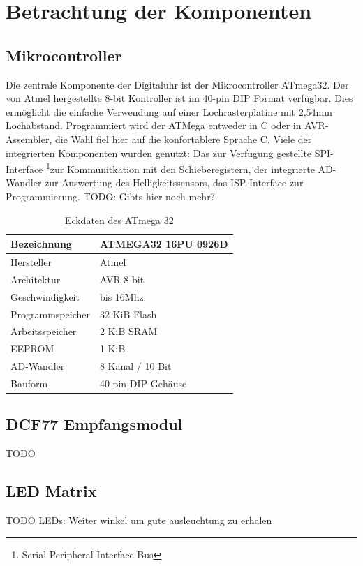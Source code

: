 \section{Betrachtung der Komponenten}
\subsection{Mikrocontroller}
Die zentrale Komponente der Digitaluhr ist der Mikrocontroller ATmega32. Der von Atmel hergestellte 8-bit Kontroller ist im 40-pin DIP Format verfügbar. Dies ermöglicht die einfache Verwendung auf einer Lochrasterplatine mit 2,54mm Lochabstand. Programmiert wird der ATMega entweder in C oder in AVR-Assembler, die Wahl fiel hier auf die konfortablere Sprache C.
Viele der integrierten Komponenten wurden genutzt: Das zur Verfügung gestellte SPI-Interface \footnote{Serial Peripheral Interface Bus}zur Kommunitkation mit den Schieberegistern, der integrierte AD-Wandler zur Auswertung des Helligkeitssensors, das ISP-Interface zur Programmierung. TODO: Gibts hier noch mehr?
\begin{table}[htp]
  \renewcommand{\arraystretch}{1.2}
  \begin{tabular}{||l | l||}
  \hline\hline
  Bezeichnung&ATMEGA32 16PU 0926D\\\hline
  Hersteller&Atmel\\\hline
  Architektur&AVR 8-bit \\\hline
  Geschwindigkeit&bis 16Mhz \\\hline
  Programmspeicher&32 KiB Flash \\\hline
  Arbeitsspeicher&2 KiB SRAM \\\hline
  EEPROM&1 KiB \\\hline
  AD-Wandler&8 Kanal / 10 Bit \\\hline
  Bauform&40-pin DIP Gehäuse \\
  \hline\hline    
\end{tabular}
\caption{Eckdaten des ATmega 32}
\end{table}

\subsection{DCF77 Empfangsmodul}\label{sec_dcf77modul}
TODO

\subsection{LED Matrix}
TODO
LEDs: Weiter winkel um gute ausleuchtung zu erhalen

